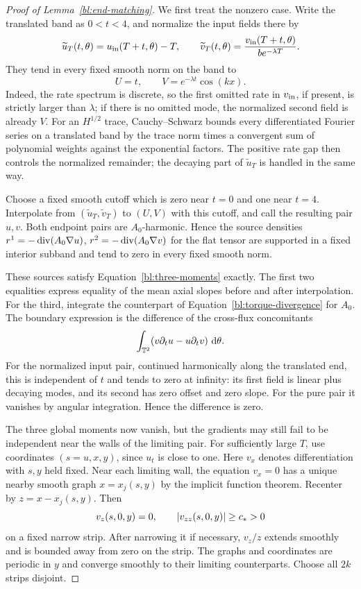 \begin{proof}[Proof of Lemma~\ref{bl:end-matching}]
We first treat the nonzero case.  Write the translated band as
$0<t<4$, and normalize the input fields there by
\[
 \widetilde u_T(t,\theta)=u_{\rm in}(T+t,\theta)-T,
 \qquad
 \widetilde v_T(t,\theta)=\frac{v_{\rm in}(T+t,\theta)}{b e^{-\lambda T}}.
\]
They tend in every fixed smooth norm on the band to
\begin{equation}\label{bl:limiting-pair}
 U=t,\qquad V=e^{-\lambda t}\cos(kx).
\end{equation}
Indeed, the rate spectrum is discrete, so the first omitted rate in
$v_{\rm in}$, if present, is strictly larger than $\lambda$; if there
is no omitted mode, the normalized second field is already $V$.
For an $H^{1/2}$ trace, Cauchy--Schwarz bounds every differentiated Fourier series on a
translated band by the trace norm times a convergent sum of polynomial
weights against the exponential factors.  The positive rate gap then
controls the normalized remainder; the decaying part of
$\widetilde u_T$ is handled in the same way.

Choose a fixed smooth cutoff which is zero near $t=0$ and one near
$t=4$.  Interpolate from $(\widetilde u_T,\widetilde v_T)$ to $(U,V)$
with this cutoff, and call the resulting pair $u,v$.  Both endpoint
pairs are $A_0$-harmonic.  Hence the source densities
$r^1=-\operatorname{div}(A_0\nabla u)$, $r^2=-\operatorname{div}(A_0\nabla v)$ for the flat
tensor are supported in a fixed interior subband and tend to zero in
every fixed smooth norm.

These sources satisfy Equation~\eqref{bl:three-moments} exactly.  The
first two equalities express equality of the mean axial slopes before
and after interpolation.  For the third, integrate the counterpart of
Equation~\eqref{bl:torque-divergence} for $A_0$.  The boundary expression
is the difference of the cross-flux concomitants
\[
 \int_{\mathbb T^2}(v\partial_tu-u\partial_tv)\,\,\mathrm d\theta.
\]
For the normalized input pair, continued harmonically along the
translated end, this is independent of $t$ and tends to zero at
infinity: its first field is linear plus decaying modes, and its second
has zero offset and zero slope.  For the pure pair it vanishes by angular
integration.  Hence the difference is zero.

The three global moments now vanish, but the gradients may still fail
to be independent near the walls of the limiting pair.  For
sufficiently large $T$, use coordinates $(s=u,x,y)$, since $u_t$ is
close to one.  Here $v_x$
denotes differentiation with $s,y$ held fixed.  Near each limiting
wall, the equation $v_x=0$ has a unique nearby smooth graph
$x=x_j(s,y)$ by the implicit function theorem.  Recenter by
$z=x-x_j(s,y)$.  Then
\begin{equation}\label{bl:wall-simple}
 v_z(s,0,y)=0,\qquad \left\lvert v_{zz}(s,0,y)\right\rvert\ge c_*>0
\end{equation}
on a fixed narrow strip.  After narrowing it if necessary, $v_z/z$
extends smoothly and is bounded away from zero on the strip.  The
graphs and coordinates are periodic in $y$ and converge smoothly to
their limiting counterparts.  Choose all $2k$ strips disjoint.


\end{proof}
